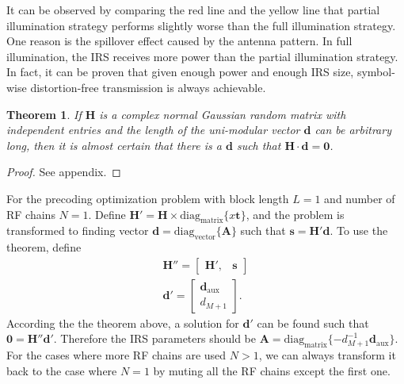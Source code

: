 \documentclass[12pt,draftclsnofoot,onecolumn,journal]{IEEEtran}
\newtheorem{theorem}{Theorem}
\begin{document}
It can be observed by comparing the red line and the yellow line that partial illumination strategy performs slightly worse than the full illumination strategy. One reason is the spillover effect caused by the antenna pattern. In full illumination, the IRS receives more power than the partial illumination
strategy. In fact, it can be proven that given enough power and enough IRS size, symbol-wise distortion-free transmission is always achievable.

\begin{theorem}
If \(\mathbf H\) is a complex normal Gaussian random matrix with independent entries and the length of the uni-modular vector \(\mathbf d\) can be arbitrary long, then it is almost certain that there is a \(\mathbf d\) such that \(\mathbf H\cdot\mathbf d=\mathbf 0\).
\label{th:firsttheorem}
\end{theorem}
\begin{proof}
See appendix.
\end{proof}


For the precoding optimization problem with block length $L=1$ and number of RF chains $N=1$. Define $\mathbf H'=\mathbf H\times \mathrm{diag}_\mathrm{matrix}\{x\mathbf t\}$, and the problem is transformed to finding vector $\mathbf d=\mathrm{diag}_{\mathrm{vector}}\{\mathbf A\}$ such that $\mathbf s=\mathbf H'\mathbf d$. To use the theorem, define
\begin{equation}
\begin{split}
\mathbf H''=\begin{bmatrix}
\mathbf H', &\mathbf s
\end{bmatrix}\\
\mathbf d'=\begin{bmatrix}
\mathbf d_{\mathrm{aux}}\\
d_{M+1}
\end{bmatrix}.
\end{split}
\end{equation}
According the the theorem above, a solution for $\mathbf d'$ can be found such that $\mathbf 0=\mathbf H''\mathbf d'$. Therefore the IRS parameters should be $\mathbf A=\mathrm{diag}_{\mathrm{matrix}}\{-d_{M+1}^{-1}\mathbf d_{\mathrm{aux}}\}$. For the cases where more RF chains are used $N>1$, we can always transform it back to the case where $N=1$ by muting all the RF chains except the first one. 
\end{document}
